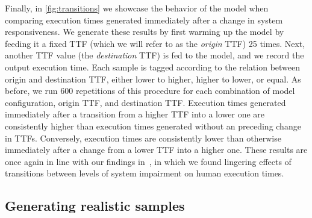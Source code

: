 Finally, in \cref{fig:transitions} we showcase the behavior of the model when comparing execution times generated immediately after a change in system responsiveness.
We generate these results by first warming up the model by feeding it a fixed \ac{TTF} (which we will refer to as the \emph{origin} \ac{TTF}) \num{25} times.
Next, another \ac{TTF} value (the \emph{destination} \ac{TTF}) is fed to the model, and we record the output execution time.
Each sample is tagged according to the relation between origin and destination \ac{TTF}, either lower to higher, higher to lower, or equal.
As before, we run \num{600} repetitions of this procedure for each combination of model configuration, origin \ac{TTF}, and destination \ac{TTF}.
Execution times generated immediately after a transition from a higher \ac{TTF} into a lower one are consistently higher than execution times generated without an preceding change in \acp{TTF}.
Conversely, execution times are consistently lower than otherwise immediately after a change from a lower \ac{TTF} into a higher one.
These results are once again in line with our findings in~\cite{olguinmunoz:impact2021}, in which we found lingering effects of transitions between levels of system impairment on human execution times.


\subsection{Generating realistic samples}\label{ssec:model:frames}

